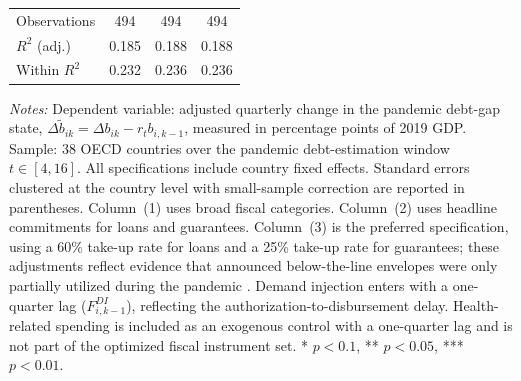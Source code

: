 \begin{table}[H]
\begin{tabular}{@{} l c c c @{}}
Observations & 494 & 494 & 494 \\
$R^2$ (adj.) & 0.185 & 0.188 & 0.188 \\
Within $R^2$ & 0.232 & 0.236 & 0.236 \\
\bottomrule
\end{tabular}
\vspace{4pt}
\parbox{\textwidth}{\scriptsize\textit{Notes:} Dependent variable: adjusted quarterly change in the pandemic debt-gap state, $\Delta \tilde b_{ik}=\Delta b_{ik}-r_t b_{i,k-1}$, measured in percentage points of 2019 GDP. Sample: 38 OECD countries over the pandemic debt-estimation window $t \in [4,16]$. All specifications include country fixed effects. Standard errors clustered at the country level with small-sample correction are reported in parentheses. Column~(1) uses broad fiscal categories. Column~(2) uses headline commitments for loans and guarantees. Column~(3) is the preferred specification, using a 60\% take-up rate for loans and a 25\% take-up rate for guarantees; these adjustments reflect evidence that announced below-the-line envelopes were only partially utilized during the pandemic \citep{esrb2021monitoring, europeanparliament2022guarantees}. Demand injection enters with a one-quarter lag ($F^{DI}_{i,k-1}$), reflecting the authorization-to-disbursement delay. Health-related spending is included as an exogenous control with a one-quarter lag and is not part of the optimized fiscal instrument set. * $p<0.1$, ** $p<0.05$, *** $p<0.01$.}
\end{table}
